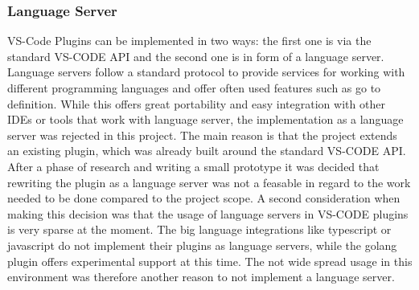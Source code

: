 \subsubsection{Language Server}

VS-Code Plugins can be implemented in two ways: the first one is via the standard VS-CODE API and the second one is in form of a language server. Language servers follow a standard protocol to provide services for working with different programming languages and offer often used features such as go to definition. While this offers great portability and easy integration with other IDEs or tools that work with language server, the implementation as a language server was rejected in this project. \newline
The main reason is that the project extends an existing plugin, which was already built around the standard VS-CODE API. After a phase of research and writing a small prototype it was decided that rewriting the plugin as a language server was not a feasable in regard to the work needed to be done compared to the project scope. \newline
A second consideration when making this decision was that the usage of language servers in VS-CODE plugins is very sparse at the moment. The big language integrations like typescript or javascript do not implement their plugins as language servers, while the golang plugin offers experimental support at this time. The not wide spread usage in this environment was therefore another reason to not implement a language server.
